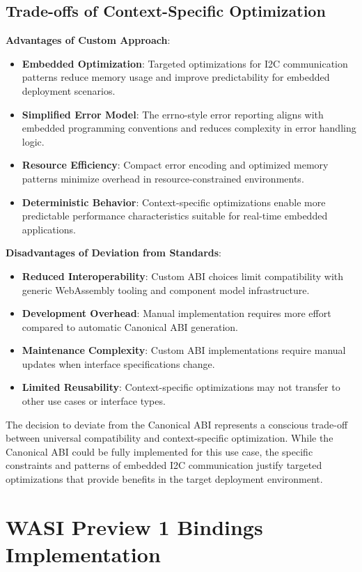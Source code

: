 \subsection{Trade-offs of Context-Specific Optimization}

\textbf{Advantages of Custom Approach}:
\begin{itemize}
    \item \textbf{Embedded Optimization}: Targeted optimizations for I2C communication patterns reduce memory usage and improve predictability for embedded deployment scenarios.
    \item \textbf{Simplified Error Model}: The errno-style error reporting aligns with embedded programming conventions and reduces complexity in error handling logic.
    \item \textbf{Resource Efficiency}: Compact error encoding and optimized memory patterns minimize overhead in resource-constrained environments.
    \item \textbf{Deterministic Behavior}: Context-specific optimizations enable more predictable performance characteristics suitable for real-time embedded applications.
\end{itemize}

\textbf{Disadvantages of Deviation from Standards}:
\begin{itemize}
    \item \textbf{Reduced Interoperability}: Custom ABI choices limit compatibility with generic WebAssembly tooling and component model infrastructure.
    \item \textbf{Development Overhead}: Manual implementation requires more effort compared to automatic Canonical ABI generation.
    \item \textbf{Maintenance Complexity}: Custom ABI implementations require manual updates when interface specifications change.
    \item \textbf{Limited Reusability}: Context-specific optimizations may not transfer to other use cases or interface types.
\end{itemize}

The decision to deviate from the Canonical ABI represents a conscious trade-off between universal compatibility and context-specific optimization. While the Canonical ABI could be fully implemented for this use case, the specific constraints and patterns of embedded I2C communication justify targeted optimizations that provide benefits in the target deployment environment.

\section{WASI Preview 1 Bindings Implementation}
\label{sec:wasip1-bindings}

